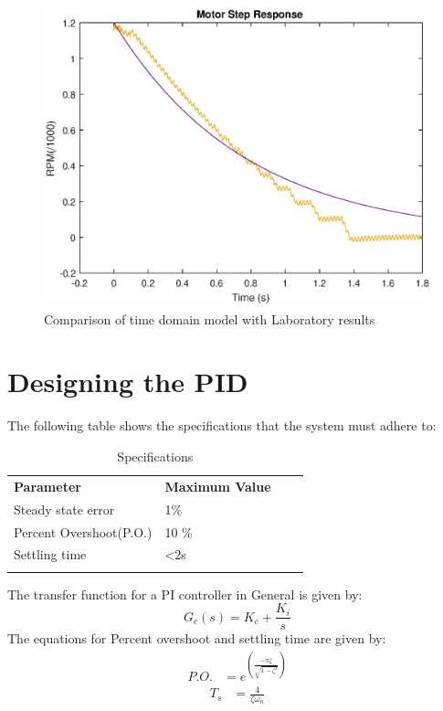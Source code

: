 \begin{figure}[h]
    \myfloatalign
    \includegraphics[width=1.2\textwidth]{gfx/Motor_shutoff_vs_Time_domain_model} %
    \caption{Comparison of time domain model with Laboratory results}
    \label{fig:shutoff_vs_model}
\end{figure}
\section{Designing the PID}
The following table shows the specifications that the system must adhere to:

\begin{table}[h]
\centering
\caption{Specifications}
\label{tbl:1}
\begin{tabular}{llll}
\cline{1-2}
\multicolumn{1}{|l|}{\textbf{Parameter}}      & \multicolumn{1}{l|}{\textbf{Maximum Value}} &  &  \\ \cline{1-2}
\multicolumn{1}{|l|}{Steady state error}    & \multicolumn{1}{l|}{1\%}                   &  &  \\ \cline{1-2}
\multicolumn{1}{|l|}{Percent Overshoot(P.O.)} & \multicolumn{1}{l|}{10 \%}                       &  &  \\ \cline{1-2}
\multicolumn{1}{|l|}{Settling time} & \multicolumn{1}{l|}{<2s}                       &  &  \\ \cline{1-2}
                                              &                                             &  & 
\end{tabular}
\end{table}
The transfer function for a PI controller in General is given by:
\begin{equation}\label{eq:2}
	G_{c}(s) = K_{c}+ \frac{K_{i}}{s}
\end{equation}
The equations for Percent overshoot and settling time are given by:
\begin{align} \label{eq:3}
P.O. &= e^{\left( \frac{-\pi\zeta}{\sqrt{1-\zeta^2}}\right)}
\end{align}
\begin{align}\label{eq:6}
T_s &= \frac{4}{\zeta\omega_n}
\end{align}

